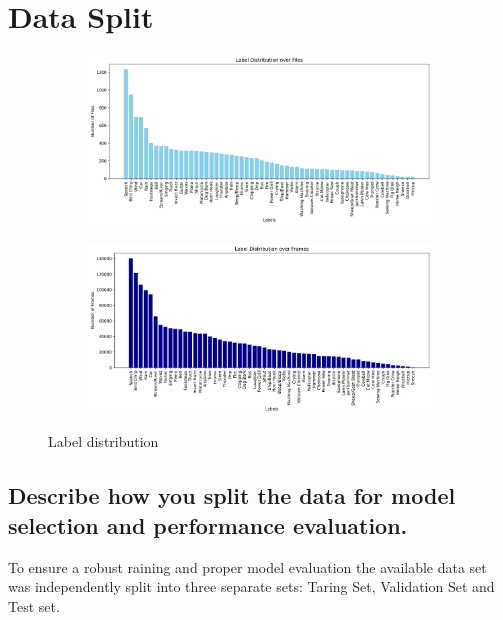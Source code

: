 
\section{Data Split} 
\label{sec:Data Split}


\begin{figure}[htbp]
  \centering
  \begin{subfigure}[b]{0.49\textwidth}
    \includegraphics[width=\textwidth]{figs/2_Label Distribution over Files.png}
  \end{subfigure}
  \hfill
  \begin{subfigure}[b]{0.49\textwidth}
    \includegraphics[width=\textwidth]{figs/2_Label Distribution over Frames.png}
  \end{subfigure}
  \caption{Label distribution}
  \label{fig:data-split}
\end{figure}



\subsection{Describe how you split the data for model selection and performance evaluation. }
\label{sec:Data Split:a}
To ensure a robust raining and proper model evaluation the available data set was independently split into three separate sets: Taring Set, Validation Set and Test set.


